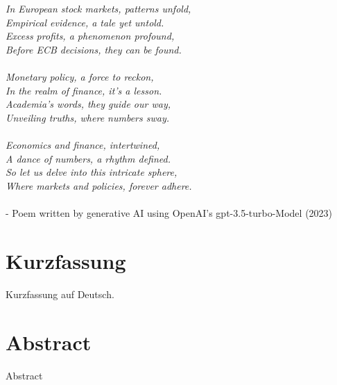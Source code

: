 

{%
	\chapter*{}


\textit{
In European stock markets, patterns unfold,\\
Empirical evidence, a tale yet untold.\\
Excess profits, a phenomenon profound,\\
Before ECB decisions, they can be found.}
\\ \\
\textit{
Monetary policy, a force to reckon,\\
In the realm of finance, it's a lesson.\\
Academia's words, they guide our way,\\
Unveiling truths, where numbers sway.}
\\ \\
\textit{
Economics and finance, intertwined,\\
A dance of numbers, a rhythm defined.\\
So let us delve into this intricate sphere,\\
Where markets and policies, forever adhere.}
\\ \\
- Poem written by generative AI using OpenAI's gpt-3.5-turbo-Model (2023)
}


{%
	\chapter*{Kurzfassung}
	
	Kurzfassung auf Deutsch. 
}

{%
	\chapter*{Abstract}
	
	Abstract
}